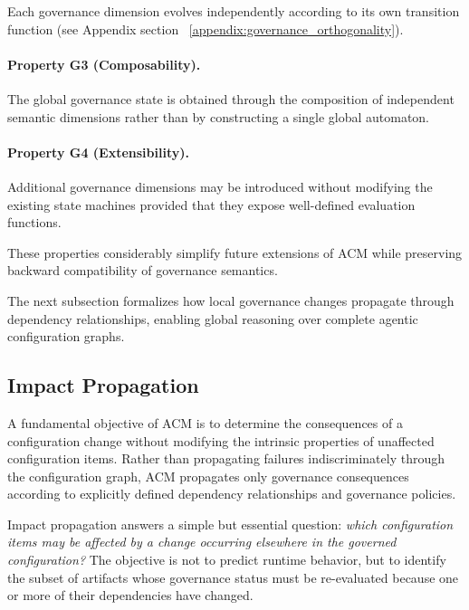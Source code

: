\documentclass[10pt]{article}
\begin{document}
Each governance dimension evolves independently according to its own transition
function (see Appendix section ~\ref{appendix:governance_orthogonality}).

\paragraph{Property G3 (Composability).}

The global governance state is obtained through the composition of independent
semantic dimensions rather than by constructing a single global automaton.

\paragraph{Property G4 (Extensibility).}

Additional governance dimensions may be introduced without modifying the
existing state machines provided that they expose well-defined evaluation
functions.

These properties considerably simplify future extensions of ACM while
preserving backward compatibility of governance semantics.

The next subsection formalizes how local governance changes propagate through
dependency relationships, enabling global reasoning over complete agentic
configuration graphs.

\subsection{Impact Propagation}
\label{subsec:impact_semantics}

A fundamental objective of ACM is to determine the consequences of a configuration change without modifying the intrinsic properties of unaffected configuration items. Rather than propagating failures indiscriminately through the configuration graph, ACM propagates only governance consequences according to explicitly defined dependency relationships and governance policies.

Impact propagation answers a simple but essential question: \emph{which configuration items may be affected by a change occurring elsewhere in the governed configuration?} The objective is not to predict runtime behavior, but to identify the subset of artifacts whose governance status must be re-evaluated because one or more of their dependencies have changed.
\end{document}
